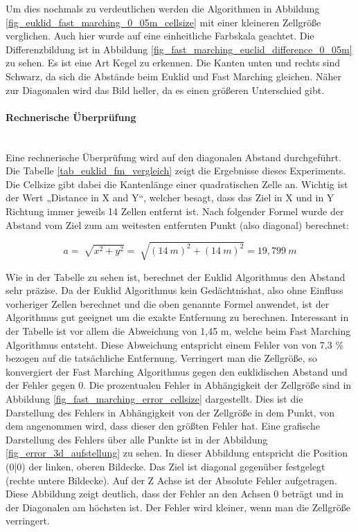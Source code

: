Um dies nochmals zu verdeutlichen werden die Algorithmen in Abbildung \ref{fig_euklid_fast_marching_0_05m_cellsize} mit einer kleineren Zellgröße verglichen. Auch hier wurde auf eine einheitliche Farbskala geachtet. Die Differenzbildung ist in Abbildung \ref{fig_fast_marching_euclid_difference_0_05m} zu sehen. Es ist eine Art Kegel zu erkennen. Die Kanten unten und rechts sind Schwarz, da sich die Abstände beim Euklid und Fast Marching gleichen. Näher zur Diagonalen wird das Bild heller, da es einen größeren Unterschied gibt.

\paragraph{Rechnerische Überprüfung}\\
Eine rechnerische Überprüfung wird auf den diagonalen Abstand durchgeführt. Die Tabelle \ref{tab_euklid_fm_vergleich} zeigt die Ergebnisse dieses Experiments. Die Cellsize gibt dabei die Kantenlänge einer quadratischen Zelle an. Wichtig ist der Wert „Distance in X and Y“, welcher besagt, dass das Ziel in X und in Y Richtung immer jeweils 14 Zellen entfernt ist.
Nach folgender Formel wurde der Abstand vom Ziel zum am weitesten entfernten Punkt (also diagonal) berechnet:

$$a = \sqrt[]{x^2 +y^2} = \sqrt[]{(14\ m) ^2 +(14\ m) ^2} = 19,799\ m$$ 

Wie in der Tabelle zu sehen ist, berechnet der Euklid Algorithmus den Abstand sehr präzise. Da der Euklid Algorithmus kein \glqq Gedächtnis\grqq  hat, also ohne Einfluss vorheriger Zellen berechnet und die oben genannte Formel anwendet, ist der Algorithmus gut geeignet um die exakte Entfernung zu berechnen. Interessant in der Tabelle ist vor allem die Abweichung von 1,45 m, welche beim Fast Marching Algorithmus entsteht. Diese Abweichung entspricht einem Fehler von von 7,3 \% bezogen auf die tatsächliche Entfernung. Verringert man die Zellgröße, so konvergiert der Fast Marching Algorithmus gegen den euklidischen Abstand und der Fehler gegen 0. Die prozentualen Fehler in Abhängigkeit der Zellgröße sind in Abbildung \ref{fig_fast_marching_error_cellsize} dargestellt. Dies ist die Darstellung des Fehlers in Abhängigkeit von der Zellgröße in dem Punkt, von dem angenommen wird, dass dieser den größten Fehler hat. Eine grafische Darstellung des Fehlers über alle Punkte ist in der Abbildung \ref{fig_error_3d_aufstellung} zu sehen. In dieser Abbildung entspricht die Position (0|0) der linken, oberen Bildecke. Das Ziel ist diagonal gegenüber festgelegt (rechte untere Bildecke). Auf der Z Achse ist der Absolute Fehler aufgetragen. Diese Abbildung zeigt deutlich, dass der Fehler an den Achsen 0 beträgt und in der Diagonalen am höchsten ist. Der Fehler wird kleiner, wenn man die Zellgröße verringert.



